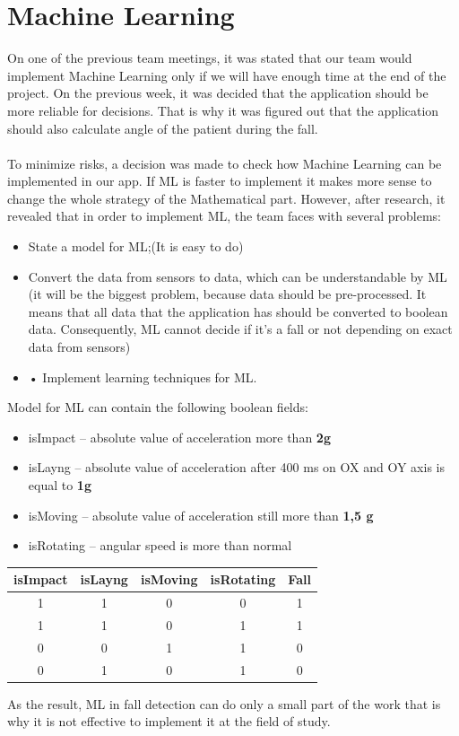 \documentclass[conference,12pt]{IEEETran}
\begin{document}
\section{Machine Learning}
On one of the previous team meetings, it was stated that our team would implement Machine Learning only if we will have enough time at the end of the project. On the previous week, it was decided that the application should be more reliable for decisions. That is why it was figured out that the application should also calculate angle of the patient during the fall.\\\\
To minimize risks, a decision was made to check how Machine Learning can be implemented in our app. If ML is faster to implement it makes more sense to change the whole strategy of the Mathematical part. However, after research, it revealed that in order to implement ML, the team faces with several problems:
\begin{itemize}
	\item State a model for ML;(It is easy to do)
	\item Convert the data from sensors to data, which can be understandable by ML (it will be the biggest problem, because data should be pre-processed. It means that all data that the application has should be converted to boolean data. Consequently, ML cannot decide if it's a fall or not depending on exact data from sensors)
	\item •	Implement learning techniques for ML.
\end{itemize}
Model for ML can contain the following boolean fields: 
\begin{itemize}
	\item isImpact – absolute value of acceleration more than \textbf{2g}
	\item isLayng – absolute value of acceleration after 400 ms on OX and OY axis is equal to \textbf{1g}
	\item isMoving – absolute value of acceleration still more than \textbf{1,5 g}
	\item isRotating – angular speed is more than normal
\end{itemize}

\begin{table}[!h]	
	\begin{center}
		{\renewcommand{\arraystretch}{2}%
		\begin{tabular}{|c|c|c|c|c|} 
			\hline
			\textbf{isImpact} & \textbf{isLayng} & \textbf{isMoving} &\textbf{isRotating} & \textbf{Fall} \\ [0.5ex] 
			\hline
			1 & 1 & 0 & 0 & 1 \\ 
			\hline
			1 & 1 & 0 & 1 & 1 \\
			\hline
			0 & 0 & 1 & 1 & 0 \\
			\hline
			0 & 1 & 0 & 1 & 0 \\  [1ex]
			\hline  
		\end{tabular}
	}
	\end{center}
\end{table}
As the result, ML in fall detection can do only a small part of the work that is why it is not effective to implement it at the field of study. 
\end{document}
